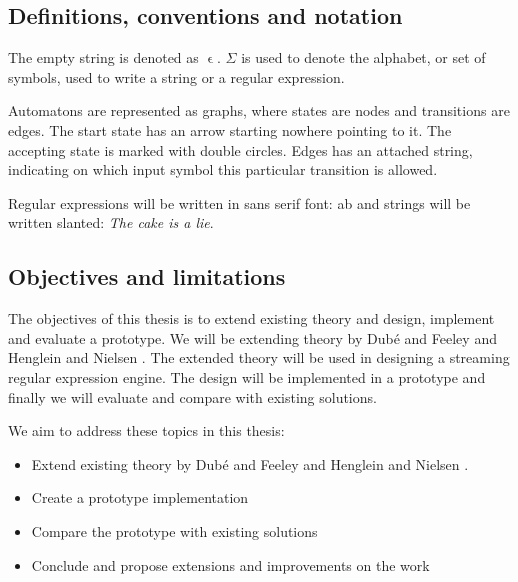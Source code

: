 

\subsection{Definitions, conventions and notation}

The empty string is denoted as $\upvarepsilon$. $\Sigma$ is used to
denote the alphabet, or set of symbols, used to write a string or a
regular expression. 

Automatons are represented as graphs, where states are nodes and
transitions are edges. The start state has an arrow starting nowhere
pointing to it. The accepting state is marked with double
circles. Edges has an attached string, indicating on which input
symbol this particular transition is allowed.

Regular expressions will be written in sans serif font:
\textsf{a\textbar b} and strings will be written slanted: \textsl{The
  cake is a lie}.


\subsection{Objectives and limitations}

The objectives of this thesis is to extend existing theory and design,
implement and evaluate a prototype. We will be extending theory by
Dub\'{e} and Feeley \cite{Dube2000} and Henglein and Nielsen
\cite{Henglein2010}. The extended theory will be used in designing a
streaming regular expression engine. The design will be implemented in
a prototype and finally we will evaluate and compare with existing
solutions.

We aim to address these topics in this thesis:

\begin{itemize}
\item Extend existing theory by Dub\'{e} and Feeley \cite{Dube2000}
  and Henglein and Nielsen \cite{Henglein2010}.

\item Create a prototype implementation

\item Compare the prototype with existing solutions 

\item Conclude and propose extensions and improvements on the work
\end{itemize}

